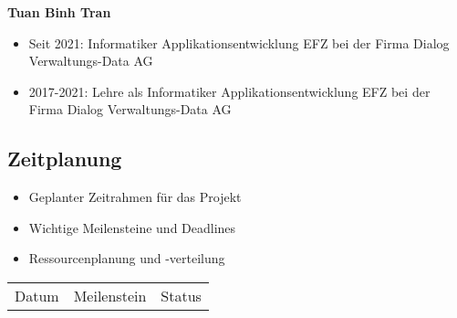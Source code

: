 \textbf{Tuan Binh Tran}
\begin{itemize}
    \item Seit 2021: Informatiker Applikationsentwicklung EFZ bei der Firma Dialog Verwaltungs-Data AG
    \item 2017-2021: Lehre als Informatiker Applikationsentwicklung EFZ bei der Firma Dialog Verwaltungs-Data AG
\end{itemize}

\subsection{Zeitplanung}
\begin{itemize}
    \item Geplanter Zeitrahmen für das Projekt
    \item Wichtige Meilensteine und Deadlines
    \item Ressourcenplanung und -verteilung
\end{itemize}

\begin{tabular}{c c c}
    Datum & Meilenstein & Status \\
    
\end{tabular}


\newpage